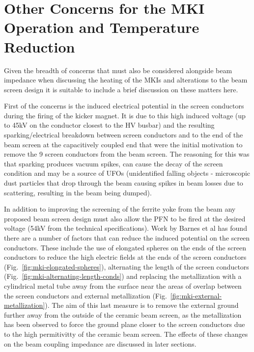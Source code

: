 \section{Other Concerns for the MKI Operation and Temperature Reduction}

Given the breadth of concerns that must also be considered alongside beam impedance when discussing the heating of the MKIs and alterations to the beam screen design it is suitable to include a brief discussion on these matters here. 

First of the concerns is the induced electrical potential in the screen conductors during the firing of the kicker magnet. It is due to this high induced voltage (up to 45kV on the conductor closest to the HV busbar) and the resulting sparking/electrical breakdown between screen conductors and to the end of the beam screen at the capacitively coupled end that were the initial motivation to remove the 9 screen conductors from the beam screen. The reasoning for this was that sparking produces vacuum spikes, can cause the decay of the screen condition and may be a source of UFOs (unidentified falling objects - microscopic dust particles that drop through the beam causing spikes in beam losses due to scattering, resulting in the beam being dumped). 

In addition to improving the screening of the ferrite yoke from the beam any proposed beam screen design must also allow the PFN to be fired at the desired voltage (54kV from the technical specifications). Work by Barnes et al \cite{Barnes:eFieldMKI} has found there are a number of factors that can reduce the induced potential on the screen conductors. These include the use of elongated spheres on the ends of the screen conductors to reduce the high electric fields at the ends of the screen conductors (Fig.~\ref{fig:mki-elongated-spheres}), alternating the length of the screen conductors (Fig.~\ref{fig:mki-alternating-length-conds}) and replacing the metallization with a cylindrical metal tube away from the surface near the areas of overlap between the screen conductors and external metallization (Fig.~\ref{fig:mki-external-metallization}). The aim of this last measure is to remove the external ground further away from the outside of the ceramic beam screen, as the metallization has been observed to force the ground plane closer to the screen conductors due to the high permitivitty of the ceramic beam screen. The effects of these changes on the beam coupling impedance are discussed in later sections.

